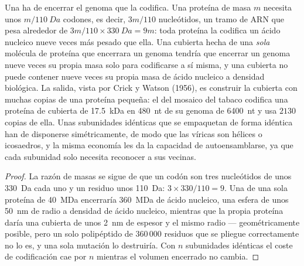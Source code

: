 \begin{proposition}\label{prop:b3:virology:economy}
Una  ha de encerrar el genoma que la codifica. Una proteína de
masa $m$ necesita unos $m/\qty{110}{Da}$ codones, es decir, $3m/110$
nucleótidos, un tramo de ARN que pesa alrededor de
$3m/110\times\qty{330}{Da} = 9m$: toda proteína la codifica un ácido
nucleico nueve veces más pesado que ella. Una cubierta hecha de una
\emph{sola} molécula de proteína que encerrara un genoma tendría que
encerrar un genoma nueve veces su propia masa solo para codificarse a sí
misma, y una cubierta no puede contener nueve veces su propia masa de
ácido nucleico a densidad biológica. La salida, vista por Crick y Watson
(1956), es construir la cubierta con muchas copias de una proteína
pequeña: el  del mosaico del tabaco codifica una proteína de
cubierta de \qty{17.5}{kDa} en \qty{480}{nt} de su genoma de
\qty{6400}{nt} y usa $2130$ copias de ella. Unas subunidades idénticas
que se empaquetan de forma idéntica han de disponerse simétricamente, de
modo que las  víricas son hélices o icosaedros, y la misma
economía les da la capacidad de autoensamblarse, ya que cada subunidad
solo necesita reconocer a sus vecinas.
\end{proposition}
\begin{proof}
La razón de masas se sigue de que un codón son tres nucleótidos de unos
\qty{330}{Da} cada uno y un residuo unos \qty{110}{Da}: $3\times 330/110 =
9$. Una  de una sola proteína de \qty{40}{MDa} encerraría
\qty{360}{MDa} de ácido nucleico, una esfera de unos \qty{50}{nm} de
radio a densidad de ácido nucleico, mientras que la propia proteína daría
una cubierta de unos \qty{2}{nm} de espesor y el mismo radio ---
geométricamente posible, pero un solo polipéptido de $360\,000$ residuos
que se pliegue correctamente no lo es, y una sola mutación lo destruiría.
Con $n$ subunidades idénticas el coste de codificación cae por $n$
mientras el volumen encerrado no cambia.
\end{proof}

